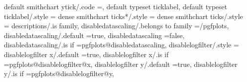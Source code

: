 {{{{{{default smithchart ytick/.code                                     =,                                                                                                                                  
default typeset ticklabel,
default typeset ticklabel/.style                                   ={                                                                                                                                  
dense smithchart ticks*/.style                                     ={                                                                                                                                  
dense smithchart ticks/.style                                      ={                                                                                                                                  
descriptions/.is family,
disabledatascaling/.belongs to family                              =/pgfplots,                                                                                                                         
disabledatascaling/.default                                        =true,                                                                                                                              
disabledatascaling                                                 =false,                                                                                                                             
disabledatascaling/.is if                                          =pgfplots@disabledatascaling,                                                                                                       
disablelogfilter/.style                                            ={                                                                                                                                  
disablelogfilter x/.default                                        =true,                                                                                                                              
disablelogfilter x/.is if                                          =pgfplots@disablelogfilter@x,                                                                                                       
disablelogfilter y/.default                                        =true,                                                                                                                              
disablelogfilter y/.is if                                          =pgfplots@disablelogfilter@y,                                                                                                       
}}}}}}}}}}
